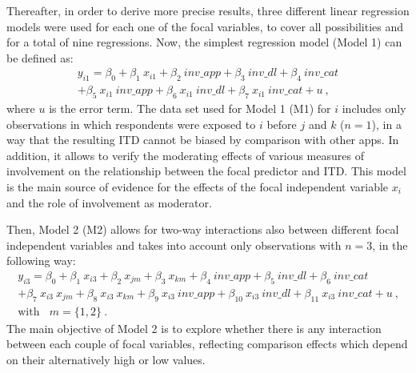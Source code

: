 Thereafter, in order to derive more precise results, three different linear regression models were used for each one of the focal variables, to cover all possibilities and for a total of nine regressions. Now, the simplest regression model (Model 1) can be defined as:
	\begin{equation}
    \begin{split}
		y_{i1} = \beta_0 + \beta_1 ~ x_{i1} + \beta_2 ~ inv\_app + \beta_3 ~ inv\_dl + \beta_4 ~ inv\_cat \\
    + \beta_5  ~ x_{i1} ~ inv\_app + \beta_6  ~ x_{i1} ~ inv\_dl + \beta_7  ~ x_{i1} ~ inv\_cat + u ~\text{,}
  \end{split}
	\end{equation}
where $u$ is the error term. The data set used for Model 1 (M1) for $i$ includes only observations in which respondents were exposed to $i$ before $j$ and $k$ ($n=1$), in a way that the resulting ITD cannot be biased by comparison with other apps. In addition, it allows to verify the moderating effects of various measures of involvement on the relationship between the focal predictor and ITD. This model is the main source of evidence for the effects of the focal independent variable $x_i$ and the role of involvement as moderator.

Then, Model 2 (M2) allows for two-way interactions also between different focal independent variables and takes into account only observations with $n=3$, in the following way:
 \begin{equation}
 \begin{split}
		y_{i3} = \beta_0 + \beta_1 ~ x_{i3} + \beta_2 ~ x_{jm} + \beta_3 ~ x_{km}
   +\beta_4 ~  inv\_app + \beta_5 ~  inv\_dl + \beta_6 ~  inv\_cat   
   \\+ \beta_7 ~ x_{i3} ~   x_{jm} +  \beta_{8} ~  x_{i3} ~   x_{km} 
   +\beta_{9}~ x_{i3} ~  inv\_app + \beta_{10} ~ x_{i3}~  inv\_dl + \beta_{11} ~ x_{i3}~  inv\_cat  + u ~\text{,} \\
    \text{with} ~~~~ m =  \{1, 2\}~\text{.}
    \end{split}
\end{equation}
The main objective of Model 2 is to explore whether there is any interaction between each couple of focal variables, reflecting comparison effects which depend on their alternatively high or low values.   

